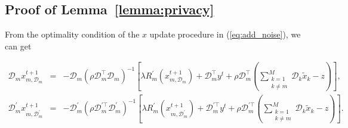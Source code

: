 \subsection{Proof of Lemma~\ref{lemma:privacy}}
From the optimality condition of the $x$ update procedure in (\ref{eq:add_noise}), we can get

\begin{eqnarray*}
  \mathcal{D}_mx_{m,\mathcal{D}_m}^{t+1}&=&-\mathcal{D}_m(\rho \mathcal{D}_m^\top \mathcal{D}_m)^{-1}
  \left[
  \lambda R_m^{\prime}(x_{m,\mathcal{D}_m}^{t+1})+\mathcal{D}_m^\top y^t+\rho\mathcal{D}_m^\top(\sum_{\substack
{k=1\\k\neq m}}^{M}\mathcal{D}_k\tilde{x}_k-z)
  \right],\\
    \mathcal{D}_m^{\prime}x_{m,\mathcal{D}_m^{\prime}}^{t+1}&=&-\mathcal{D}_m^{\prime}(\rho \mathcal{D}_m^{\prime\top} \mathcal{D}_m^{\prime})^{-1}
  \left[
  \lambda R_m^{\prime}(x_{m,\mathcal{D}_m^{\prime}}^{t+1})+\mathcal{D}_m^{\prime\top}y^t+\rho
  \mathcal{D}_m^{\prime\top}(\sum_{\substack
{k=1\\k\neq m}}^{M}\mathcal{D}_k\tilde{x}_k-z)
  \right].
\end{eqnarray*}






